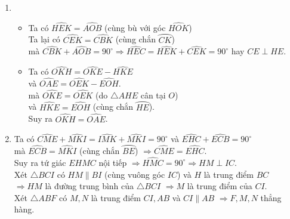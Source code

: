 \begin{ex}
{\begin{enumerate}
\begin{itemize}
				\item Ta có $\triangle ABO$ vuông tại $B$ có $BK$ là đường cao nên $AB^2=AH.AO$\\
				mà $AB^2 = AE.AK \Rightarrow AH.AO = AE.AK$\\
				Từ đây, xét $\triangle AHE$ và $\triangle AKO$ có 
				$\dfrac{AH}{AK}=\dfrac{AE}{AO}$ và $\widehat A$ chung\\
				Do đó $\triangle AHE \backsim \triangle AKO$ (c.g.c)
				$\Rightarrow \widehat{AHE} = \widehat{AKO}$.\\
				mà $\widehat{AHE} + \widehat{OHE}=180^\circ$ (kề bù).\\
				Khi đó, tứ giác $OHEK$ có $\widehat{EKO} + \widehat{OHE}=180^\circ \Rightarrow OHEK$ nội tiếp.
			\end{itemize}				
			\item
			\begin{itemize}
				\item Ta có $\widehat{HEK} = \widehat{AOB}$ (cùng bù với góc $\widehat{HOK}$)\\
				Ta lại có $\widehat{CEK} = \widehat{CBK}$ (cùng chắn $\wideparen{CK}$)\\
				mà $\widehat{CBK} + \widehat{AOB}=90^\circ \Rightarrow \widehat{HEC} = \widehat{HEK} + \widehat{CEK}=90^\circ$ hay $CE \perp HE$.
				\item 	Ta có $\widehat{OKH} = \widehat{OKE} - \widehat{HKE}$\\
				và $\widehat{OAE} = \widehat{OEK} - \widehat{EOH}$.\\
				mà $\widehat{OKE} = \widehat{OEK}$ (do $\triangle AHE$ cân tại $O$)\\
				và $\widehat{HKE} = \widehat{EOH}$ (cùng chắn $\wideparen{HE}$).\\
				Suy ra $\widehat{OKH} = \widehat{OAE}$.
			\end{itemize}
			\item 
			Ta có $\widehat{CME} + \widehat{MKI}=\widehat{IMK} + \widehat{MKI}=90^\circ$ và $\widehat{EHC} + \widehat{ECB}=90^\circ$\\
			mà $\widehat{ECB} = \widehat{MKI}$ (cùng chắn $\wideparen{BE}$) $\Rightarrow \widehat{CME} = \widehat{EHC}$.\\
			Suy ra tứ giác $EHMC$ nội tiếp $\Rightarrow \widehat{HMC}=90^\circ \Rightarrow HM \perp IC$.\\
			Xét $\triangle BCI$ có $HM \parallel BI$ (cùng vuông góc $IC$) và $H$ là trung điểm $BC$\\
			$\Rightarrow HM$ là đường trung bình của $\triangle BCI$ $\Rightarrow M$ là trung điểm của $CI$.\\
			Xét $\triangle ABF$ có $M,N$ là trung điểm $CI,AB$ và $CI \parallel AB$ $\Rightarrow F,M,N$ thẳng hàng.
			

\end{enumerate}}
\end{ex}
